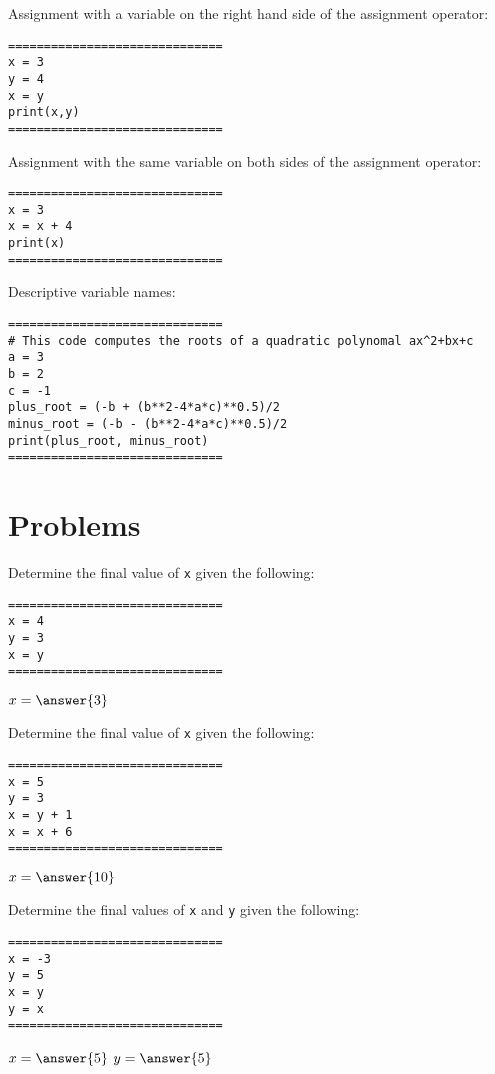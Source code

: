 \documentclass{ximera}
\begin{document}
Assignment with a variable on the right hand side of the assignment operator:

\begin{verbatim}
==============================
x = 3
y = 4
x = y
print(x,y)
==============================
\end{verbatim}

Assignment with the same variable on both sides of the assignment operator:

\begin{verbatim}
==============================
x = 3
x = x + 4
print(x)
==============================
\end{verbatim}

Descriptive variable names:

\begin{verbatim}
==============================
# This code computes the roots of a quadratic polynomal ax^2+bx+c
a = 3
b = 2
c = -1
plus_root = (-b + (b**2-4*a*c)**0.5)/2
minus_root = (-b - (b**2-4*a*c)**0.5)/2
print(plus_root, minus_root)
==============================
\end{verbatim}

\section{Problems}

\begin{question}
	Determine the final value of \verb|x| given the following:
	\begin{verbatim}
==============================
x = 4
y = 3
x = y
==============================
	\end{verbatim}
	$x = \answer{3}$
\end{question}

\begin{question}
	Determine the final value of \verb|x| given the following:
	\begin{verbatim}
==============================
x = 5
y = 3
x = y + 1
x = x + 6
==============================
	\end{verbatim}   
	$x = \answer{10}$
\end{question}

\begin{question}
	Determine the final values of \verb|x| and \verb|y| given the following:
	\begin{verbatim}
==============================
x = -3
y = 5
x = y
y = x
==============================
	\end{verbatim}
	$x = \answer{5}$
	$y = \answer{5}$
\end{question}
\end{document}

